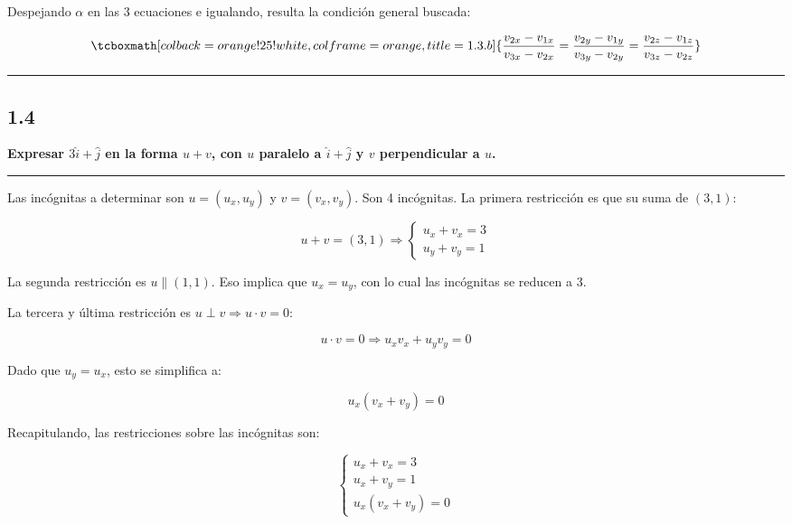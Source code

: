 \documentclass{article}
\begin{document}
Despejando $\alpha$ en las 3 ecuaciones e igualando, resulta la condición general buscada:

\begin{equation}
\tcboxmath[colback=orange!25!white,colframe=orange,title=1.3.b]
{ \frac{v_{2x} - v_{1x}}{v_{3x} - v_{2x}} = \frac{v_{2y} - v_{1y}}{v_{3y} - v_{2y}} = \frac{v_{2z} - v_{1z}}{v_{3z} - v_{2z}} }
\end{equation}

\hrule
\vspace{10 pt}

\subsection*{1.4}
\label{subsec:1.4}

\textbf{Expresar $3 \hat{i}+\hat{j}$ en la forma $u + v$, con $u$ paralelo a $\hat{i} + \hat{j}$ y $v$ perpendicular a $u$.} 

\vspace{10 pt}
\hrule
\vspace{10 pt}

Las incógnitas a determinar son $u = (u_x, u_y)$ y $v = (v_x, v_y)$. Son 4 incógnitas. La primera restricción es que su suma de $(3, 1)$:

\begin{equation}
u + v = (3, 1) \Rightarrow \left\{ \begin{array}{ll}
u_x + v_x = 3 \\
u_y + v_y = 1
\end{array} \right.
\end{equation}

La segunda restricción es $u \parallel (1, 1)$. Eso implica que $u_x = u_y$, con lo cual las incógnitas se reducen a 3.

La tercera y última restricción es $u \perp v \Rightarrow u \cdot v = 0$:

\begin{equation}
u \cdot v = 0 \Rightarrow u_x v_x + u_y v_y = 0
\end{equation}

Dado que $u_y = u_x$, esto se simplifica a:

\begin{equation}
u_x (v_x + v_y) = 0
\end{equation}

Recapitulando, las restricciones sobre las incógnitas son:

\begin{equation}
\left\{
\begin{array}{ll}
u_x + v_x = 3 \\
u_x + v_y = 1 \\
u_x (v_x + v_y) = 0
\end{array} \right.
\end{equation}
\end{document}

